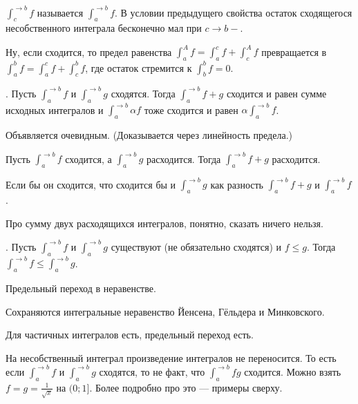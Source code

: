 \documentclass{article}
\begin{document}
\begin{itemize}
        \dfn $\int_c^{\to b}f$ называется  $\int_a^{\to b}f$.
        \thm В условии предыдущего свойства остаток сходящегося несобственного интеграла бесконечно мал при $c\to b-$.
        \begin{Proof}
            Ну, если сходится, то предел равенства $\int_a^Af=\int_a^cf+\int_c^Af$ превращается в $\int_a^bf=\int_a^cf+\int_c^bf$, где остаток стремится к $\int_b^bf=0$.
        \end{Proof}
        \thm {}. Пусть $\int_a^{\to b}f$ и $\int_a^{\to b}g$ сходятся. Тогда $\int_a^{\to b}f+g$ сходится и равен сумме исходных интегралов и $\int_a^{\to b}\alpha f$ тоже сходится и равен $\alpha\int_a^{\to b}f$.
        \begin{Proof}
            Объявляется очевидным. (Доказывается через линейность предела.)
        \end{Proof}
        \thm Пусть $\int_a^{\to b}f$ сходится, а $\int_a^{\to b}g$ расходится. Тогда $\int_a^{\to b}f+g$ расходится.
        \begin{Proof}
            Если бы он сходится, что сходится бы и $\int_a^{\to b}g$ как разность $\int_a^{\to b}f+g$ и $\int_a^{\to b}f$.
        \end{Proof}
        \begin{Comment}
            Про сумму двух расходящихся интегралов, понятно, сказать ничего нельзя.
        \end{Comment}
        \thm {}. Пусть $\int_a^{\to b}f$ и $\int_a^{\to b}g$ существуют (не обязательно сходятся) и $f\leqslant g$. Тогда $\int_a^{\to b}f\leqslant\int_a^{\to b}g$.
        \begin{Proof}
            Предельный переход в неравенстве.
        \end{Proof}
        \thm Сохраняются интегральные неравенство Йенсена, Гёльдера и Минковского.
        \begin{Proof}
            Для частичных интегралов есть, предельный переход есть.
        \end{Proof}
        \begin{Comment}
            На несобственный интеграл произведение интегралов не переносится. То есть если $\int_a^{\to b}f$ и $\int_a^{\to b}g$ сходятся, то не факт, что $\int_a^{\to b}fg$ сходится. Можно взять $f=g=\frac1{\sqrt x}$ на $(0;1]$. Более подробно про это --- примеры сверху.
        \end{Comment}

\end{itemize}
\end{document}
